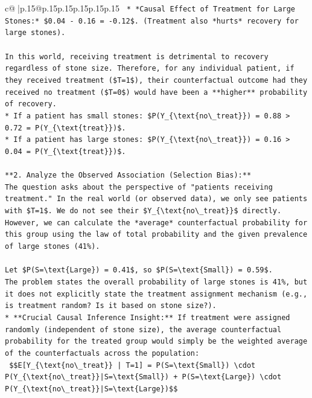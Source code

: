 \documentclass{article}
\begin{document}
{\begin{supertabular}{c@{$\;$}|p{.15\linewidth}@{}p{.15\linewidth}p{.15\linewidth}p{.15\linewidth}p{.15\linewidth}p{.15\linewidth}}
{{{\texttt{    *   *Causal Effect of Treatment for Large Stones:* \$0.04 {-} 0.16 = {-}0.12\$. (Treatment also *hurts* recovery for large stones).} \\
\\ 
\texttt{In this world, receiving treatment is detrimental to recovery regardless of stone size. Therefore, for any individual patient, if they received treatment (\$T=1\$), their counterfactual outcome had they received no treatment (\$T=0\$) would have been a **higher** probability of recovery.} \\
\texttt{*   If a patient has small stones: \$P(Y\_\{\textbackslash{}text\{no\textbackslash{}\_treat\}\}) = 0.88 > 0.72 = P(Y\_\{\textbackslash{}text\{treat\}\})\$.} \\
\texttt{*   If a patient has large stones: \$P(Y\_\{\textbackslash{}text\{no\textbackslash{}\_treat\}\}) = 0.16 > 0.04 = P(Y\_\{\textbackslash{}text\{treat\}\})\$.} \\
\\ 
\texttt{**2. Analyze the Observed Association (Selection Bias):**} \\
\texttt{The question asks about the perspective of "patients receiving treatment." In the real world (or observed data), we only see patients with \$T=1\$. We do not see their \$Y\_\{\textbackslash{}text\{no\textbackslash{}\_treat\}\}\$ directly. However, we can calculate the *average* counterfactual probability for this group using the law of total probability and the given prevalence of large stones (41\%).} \\
\\ 
\texttt{Let \$P(S=\textbackslash{}text\{Large\}) = 0.41\$, so \$P(S=\textbackslash{}text\{Small\}) = 0.59\$.} \\
\texttt{The problem states the overall probability of large stones is 41\%, but it does not explicitly state the treatment assignment mechanism (e.g., is treatment random? Is it based on stone size?).} \\
\texttt{*   **Crucial Causal Inference Insight:** If treatment were assigned randomly (independent of stone size), the average counterfactual probability for the treated group would simply be the weighted average of the counterfactuals across the population:} \\
\texttt{    \$\$E{[}Y\_\{\textbackslash{}text\{no\textbackslash{}\_treat\}\} | T=1{]} = P(S=\textbackslash{}text\{Small\}) \textbackslash{}cdot P(Y\_\{\textbackslash{}text\{no\textbackslash{}\_treat\}\}|S=\textbackslash{}text\{Small\}) + P(S=\textbackslash{}text\{Large\}) \textbackslash{}cdot P(Y\_\{\textbackslash{}text\{no\textbackslash{}\_treat\}\}|S=\textbackslash{}text\{Large\})\$\$} \\
}}}
\end{supertabular}}
\end{document}
